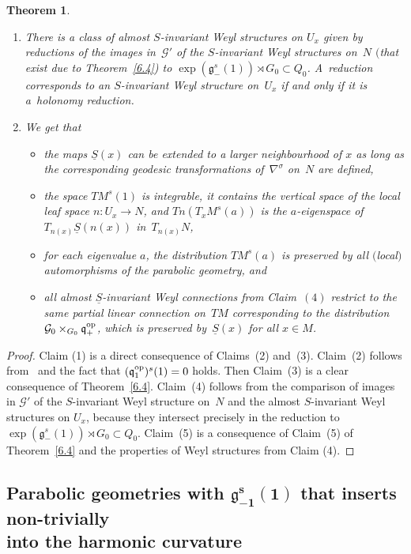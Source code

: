 \documentclass[10pt,a4paper]{amsart}
\newcommand{\si}{\sigma}
\newcommand{\un}{\underline}
\newcommand{\ba}{\mathcal{G}}
\newcommand{\fg}{\mathfrak g}
\newcommand{\fv}{\mathfrak q}
\newcommand{\fp}{\mathfrak p}
\newcommand{\fl}{\mathfrak l}
\numberwithin{equation}{section}
\newtheorem{Theorem}{Theorem}[section]
\begin{document}
\begin{Theorem}
\begin{enumerate}
The pseudo-group generated by all local $s$-symmetries is locally transitive at~$x$ if and only if $\fv/\fp\subset \fl/(\fl\cap \fp)$, i.e., if and only if $(R^\si(n(x)))_\si$ spans the whole $\fv/\fp$.
\item[$4.$] There is a class of almost $S$-invariant Weyl structures on $U_x$ given by reductions of the images in~$\ba'$ of the $S$-invariant Weyl structures on~$N$ $($that exist due to Theorem~{\rm \ref{6.4})} to $\exp(\fg_-^s(1))\rtimes G_0\subset Q_0$. A~reduction corresponds to an $S$-invariant Weyl structure on~$U_x$ if and only if it is a~holonomy reduction.
\item[$5.$] We get that
\begin{itemize}\itemsep=0pt
\item the maps $\un S(x)$ can be extended to a larger neighbourhood of $x$ as long as the corresponding geodesic transformations of~$\nabla^\si$ on~$N$ are defined,
\item the space $TM^s(1)$ is integrable, it contains the vertical space of the local leaf space $n\colon U_x\to N$, and $Tn(T_xM^s(a))$ is the $a$-eigenspace of $T_{n(x)}\un S(n(x))$ in~$T_{n(x)}N$,
\item for each eigenvalue $a$, the distribution $TM^s(a)$ is preserved by all $($local$)$ automorphisms of the parabolic geometry, and
\item all almost $\un S$-invariant Weyl connections from Claim~$(4)$ restrict to the same partial linear connection on~$TM$ corresponding to the distribution $\ba_0\times_{G_0}\fv^{\rm op}_+$, which is preserved by~$\un S(x)$ for all $x\in M$.
\end{itemize}
\end{enumerate}
\end{Theorem}
\begin{proof}
Claim (1) is a direct consequence of Claims~(2) and~(3). Claim~(2) follows from~\cite{cap-cor} and the fact that $(\fv^{\rm op}_1)^s(1)=0$ holds. Then Claim~(3) is a clear consequence of Theorem~\ref{6.4}. Claim~(4) follows from the comparison of images in $\ba'$ of the $S$-invariant Weyl structure on~$N$ and the almost $S$-invariant Weyl structures on $U_x$, because they intersect precisely in the reduction to $\exp(\fg_-^s(1))\rtimes G_0\subset Q_0$. Claim~(5) is a consequence of Claim~(5) of Theorem~\ref{6.4} and the properties of Weyl structures from Claim (4).
\end{proof}

\subsection[Parabolic geometries with $\fg_{-1}^s(1)$ that inserts non-trivially into the harmonic curvature]{Parabolic geometries with $\boldsymbol{\fg_{-1}^s(1)}$ that inserts non-trivially\\ into the harmonic curvature}
\end{document}
